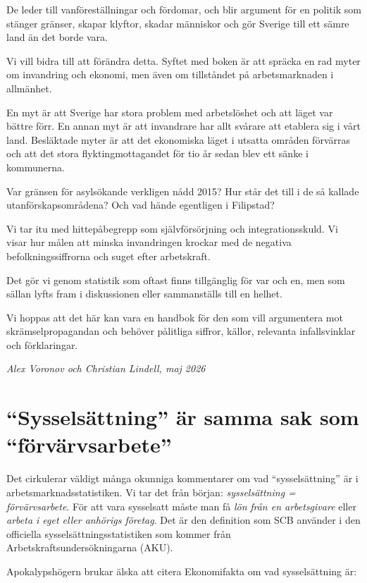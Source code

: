 \documentclass[
  letterpaper,
  DIV=11,
  numbers=noendperiod]{scrreprt}
\begin{document}
De leder till vanföreställningar och fördomar, och blir argument för en
politik som stänger gränser, skapar klyftor, skadar människor och gör
Sverige till ett sämre land än det borde vara.

Vi vill bidra till att förändra detta. Syftet med boken är att spräcka
en rad myter om invandring och ekonomi, men även om tillståndet på
arbetsmarknaden i allmänhet.

En myt är att Sverige har stora problem med arbetslöshet och att läget
var bättre förr. En annan myt är att invandrare har allt svårare att
etablera sig i vårt land. Besläktade myter är att det ekonomiska läget i
utsatta områden förvärras och att det stora flyktingmottagandet för tio
år sedan blev ett sänke i kommunerna.

Var gränsen för asylsökande verkligen nådd 2015? Hur står det till i de
så kallade utanförskapsområdena? Och vad hände egentligen i Filipstad?

Vi tar itu med hittepåbegrepp som självförsörjning och
integrationsskuld. Vi visar hur målen att minska invandringen krockar
med de negativa befolkningssiffrorna och suget efter arbetskraft.

Det gör vi genom statistik som oftast finns tillgänglig för var och en,
men som sällan lyfts fram i diskussionen eller sammanställs till en
helhet.

Vi hoppas att det här kan vara en handbok för den som vill argumentera
mot skrämselpropagandan och behöver pålitliga siffror, källor, relevanta
infallsvinklar och förklaringar.

\emph{Alex Voronov och Christian Lindell, maj 2026}


\chapter{``Sysselsättning'' är samma sak som
``förvärvsarbete''}\label{sysselsuxe4ttning-uxe4r-samma-sak-som-fuxf6rvuxe4rvsarbete}

Det cirkulerar väldigt många okunniga kommentarer om vad
``sysselsättning'' är i arbetsmarknadsstatistiken. Vi tar det från
början: \emph{sysselsättning = förvärvsarbete}. För att vara sysselsatt
måste man få \emph{lön} \emph{från en arbetsgivare} eller \emph{arbeta i
eget eller anhörigs företag}. Det är den definition som SCB använder i
den officiella sysselsättningsstatistiken som kommer från
Arbetskraftsundersökningarna (AKU).

Apokalypshögern brukar älska att citera Ekonomifakta om vad
sysselsättning är:
\end{document}
